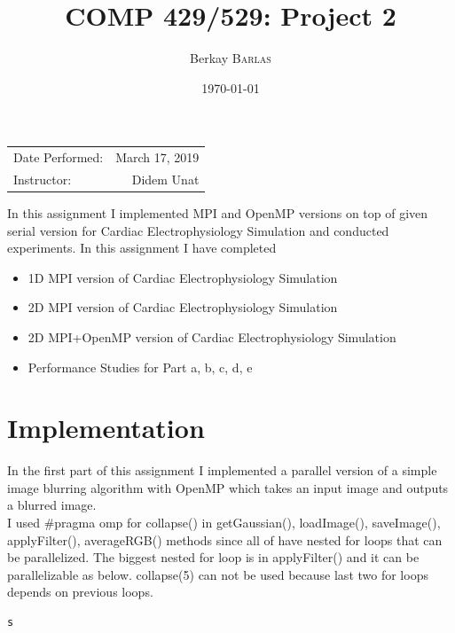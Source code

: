 \documentclass{article}
\title{COMP 429/529: Project 2} %
\author{Berkay \textsc{Barlas}} %
\date{\today} %
\newcommand\tab[1][0.5cm]{\hspace*{#1}}
\begin{document}
\maketitle %

\begin{center}
\begin{tabular}{l r}
Date Performed: & March 17, 2019 \\ %
Instructor: & Didem Unat %
\end{tabular}
\end{center}



\tab In this assignment I implemented MPI and OpenMP versions
on top of given serial version for Cardiac Electrophysiology Simulation and conducted experiments. 
\newline
\newline
In this assignment I have completed
\begin{itemize}
    \item 1D MPI version of Cardiac Electrophysiology Simulation
    \item 2D MPI version of Cardiac Electrophysiology Simulation
    \item 2D MPI+OpenMP version of Cardiac Electrophysiology Simulation
    \item Performance Studies for Part a, b, c, d, e
\end{itemize}

\section{Implementation}
\tab In the first part of this assignment I implemented 
a parallel version of a simple image blurring algorithm with
OpenMP which takes an input image and outputs a blurred image.
\\
\tab I used \#pragma omp for collapse() in getGaussian(), loadImage(), saveImage(), applyFilter(), averageRGB() 
methods since all of have nested for loops that can be parallelized. The biggest nested for loop is in applyFilter() 
and it can be parallelizable as below. collapse(5) can not be used because last two for loops depends on previous loops.
\begin{lstlisting}[language=C]
    s
\end{lstlisting}
\end{document}

